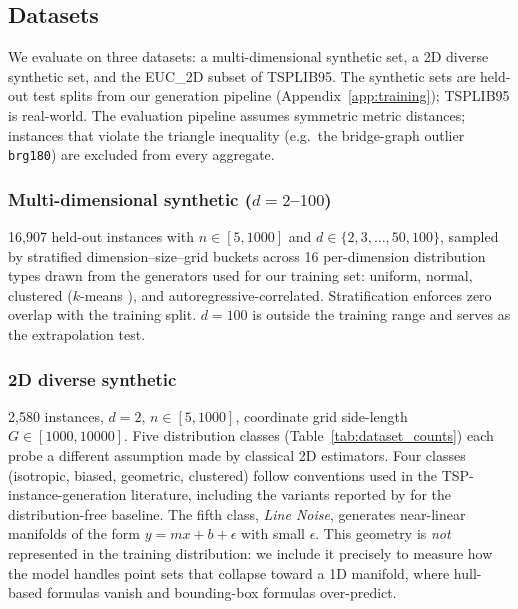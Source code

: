 \subsection{Datasets} \label{subsec:datasets}

We evaluate on three datasets: a multi-dimensional synthetic set, a 2D diverse synthetic set, and the EUC\_2D subset of TSPLIB95. The synthetic sets are held-out test splits from our generation pipeline (Appendix~\ref{app:training}); TSPLIB95 is real-world. The evaluation pipeline assumes symmetric metric distances; instances that violate the triangle inequality (e.g.\ the bridge-graph outlier \texttt{brg180}) are excluded from every aggregate.

\subsubsection{Multi-dimensional synthetic ($d = 2$--$100$)}
16{,}907 held-out instances with $n \in [5, 1000]$ and $d \in \{2, 3, \ldots, 50, 100\}$, sampled by stratified dimension--size--grid buckets across 16 per-dimension distribution types drawn from the generators used for our training set: uniform, normal, clustered ($k$-means \citep{lloyd1982}), and autoregressive-correlated. Stratification enforces zero overlap with the training split. $d = 100$ is outside the training range and serves as the extrapolation test.

\subsubsection{2D diverse synthetic}
2{,}580 instances, $d = 2$, $n \in [5, 1000]$, coordinate grid side-length $G \in [1000, 10000]$. Five distribution classes (Table~\ref{tab:dataset_counts}) each probe a different assumption made by classical 2D estimators. Four classes (isotropic, biased, geometric, clustered) follow conventions used in the TSP-instance-generation literature, including the variants reported by \citet{cavdar2015distribution} for the distribution-free baseline. The fifth class, \textit{Line Noise}, generates near-linear manifolds of the form $y = mx + b + \epsilon$ with small $\epsilon$. This geometry is \emph{not} represented in the training distribution: we include it precisely to measure how the model handles point sets that collapse toward a 1D manifold, where hull-based formulas vanish and bounding-box formulas over-predict.

